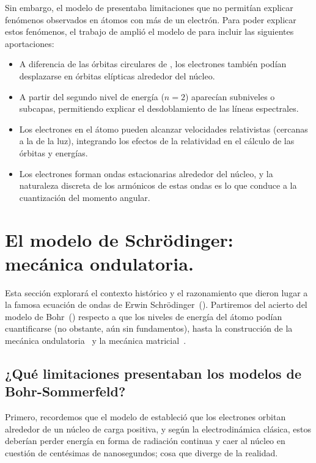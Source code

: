 \documentclass[11pt,a4paper,spanish]{book}
\begin{document}
\vspace{8pt}
Sin embargo, el modelo de \citet{bohr1913} presentaba limitaciones que
no permitían explicar fenómenos observados en átomos con más de un
electrón. Para poder explicar estos fenómenos, el trabajo de
\citet{sommerfeld1916} amplió el modelo de \citet{bohr1913}
para incluir las siguientes aportaciones:
\begin{itemize}[nosep]
  \item A diferencia de las órbitas circulares de \citet{bohr1913},
    los electrones también podían desplazarse en órbitas elípticas
    alrededor del núcleo.
  \item A partir del segundo nivel de energía ($n=2$) aparecían
    subniveles o subcapas, permitiendo explicar el desdoblamiento de
    las líneas espectrales.
  \item Los electrones en el átomo pueden alcanzar velocidades
    relativistas (cercanas a la de la luz), integrando los efectos de
    la relatividad en el cálculo de las órbitas y energías.
  \item Los electrones forman ondas estacionarias alrededor del
    núcleo, y la naturaleza discreta de los armónicos de estas ondas
    es lo que conduce a la cuantización del momento angular.
\end{itemize}
\section{El modelo de Schrödinger: mecánica ondulatoria.}

Esta sección explorará el contexto histórico y el razonamiento que
dieron lugar a la famosa ecuación de ondas de Erwin
Schrödinger~(\citeyear{schrodinger1926}). Partiremos del acierto del modelo
de Bohr~(\citeyear{bohr1913}) respecto a que los niveles de energía
del átomo podían
cuantificarse (no obstante, aún sin fundamentos), hasta la
construcción de la mecánica ondulatoria~\citep{schrodinger1926}
y la mecánica matricial~\citep{heisenberg1925}.

\subsection{¿Qué limitaciones presentaban los modelos de Bohr-Sommerfeld?}

Primero, recordemos que el modelo de \cite{rutherford1911} estableció
que los electrones orbitan alrededor de un núcleo de carga positiva,
y según la electrodinámica clásica, estos deberían perder energía
en forma de radiación continua y caer al núcleo en cuestión de
centésimas de nanosegundos; cosa que diverge de la realidad.
\end{document}
